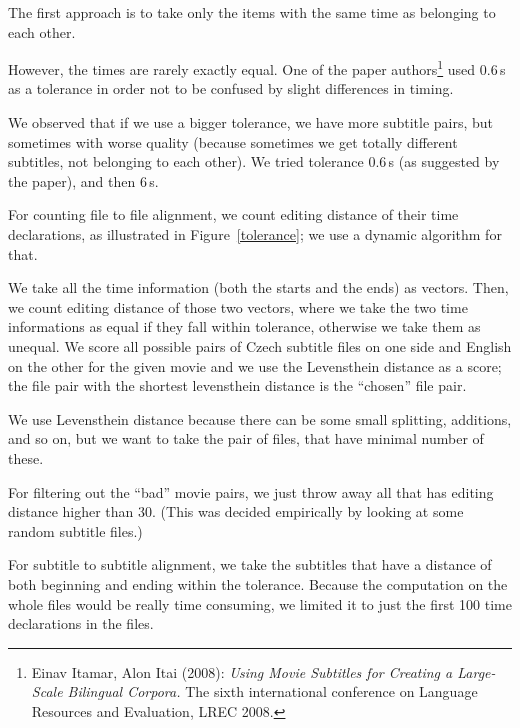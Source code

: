 The first approach is to take only the items with the same time as belonging to each other.

However, the times are rarely exactly equal. One of the paper authors\footnote{Einav Itamar, Alon Itai (2008): \emph{Using Movie Subtitles for Creating a Large-Scale Bilingual Corpora.} The sixth international conference on Language Resources and Evaluation, LREC 2008.} used 0.6\,s as a tolerance in order not to be confused by slight differences in timing.

We observed that if we use a bigger tolerance, we have more subtitle pairs, but sometimes with worse quality (because sometimes we get totally different subtitles, not belonging to each other). We tried tolerance 0.6\,s (as suggested by the paper), and then 6\,s.

For counting file to file alignment, we count editing distance of their time declarations, as illustrated in Figure~\ref{tolerance}; we use a dynamic algorithm for that.

We take all the time information (both the starts and the ends) as vectors. Then, we count editing distance of those two vectors, where we take the two time informations as equal if they fall within tolerance, otherwise we take them as unequal. We score all possible pairs of Czech subtitle files on one side and English on the other for the given movie and we use the Levensthein distance as a score; the file pair with the shortest levensthein distance is the ``chosen'' file pair.

We use Levensthein distance because there can be some small splitting, additions, and so on, but we want to take the pair of files, that have minimal number of these.

For filtering out the ``bad'' movie pairs, we just throw away all that has editing distance higher than 30. (This was decided empirically by looking at some random subtitle files.)

For subtitle to subtitle alignment, we take the subtitles that have a distance of both beginning and ending within the tolerance. Because the computation on the whole files would be really time consuming, we limited it to just the first 100 time declarations in the files.


